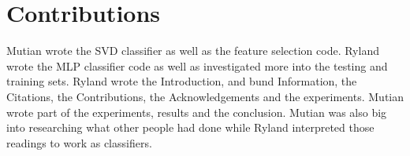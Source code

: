 
\section{Contributions}
\label{sec:contrib}

Mutian wrote the SVD classifier as well as the feature selection
code. Ryland wrote the MLP classifier code as well as investigated
more into the testing and training sets. Ryland wrote the
Introduction, and bund Information, the Citations, the
Contributions, the Acknowledgements and the experiments. Mutian wrote part of the experiments,  results and the conclusion. Mutian was
also big into researching what other people had done while Ryland
interpreted those readings to work as classifiers.
